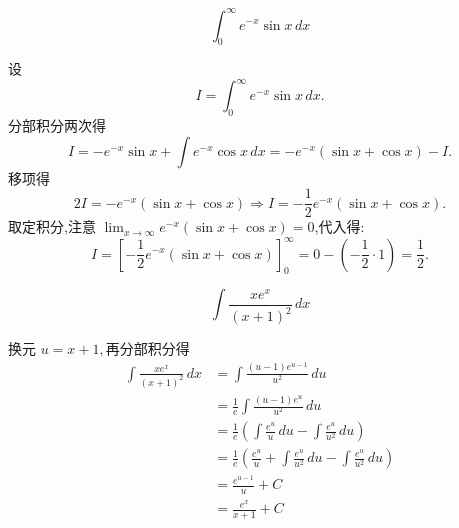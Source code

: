 \begin{questions}
    \question 
    \[
    \int_0^{\infty} e^{-x} \sin x \, dx
    \]
    \begin{solution}
        设
        \[
        I = \int_0^{\infty} e^{-x} \sin x \, dx.
        \]
        分部积分两次得
        \[
        I = -e^{-x} \sin x + \int e^{-x} \cos x \, dx
        = -e^{-x} (\sin x + \cos x) - I.
        \]
        移项得
        \[
        2I = -e^{-x} (\sin x + \cos x)
        \Rightarrow I = -\frac{1}{2} e^{-x} (\sin x + \cos x).
        \]
        取定积分,注意 $\displaystyle \lim_{x \to \infty} e^{-x} (\sin x + \cos x) = 0$,代入得:
        \[
        I = \left[ -\frac{1}{2} e^{-x} (\sin x + \cos x) \right]_0^{\infty}
        = 0 - \left(-\frac{1}{2} \cdot 1\right) = \frac{1}{2}.
        \]
    \end{solution}

    \question 
    \[
    \int \frac{xe^x}{(x+1)^2} \,dx
    \]
    \begin{solution}
        换元 $u=x+1,$再分部积分得 
        \begin{align*}
        \int \frac{xe^x}{(x+1)^2} \,dx 
        &= \int \frac{(u - 1)e^{u - 1}}{u^2} \,du \\
        &= \frac{1}{e} \int \frac{(u - 1)e^u}{u^2} \,du \\
        &= \frac{1}{e} \left( \int \frac{e^u}{u} \,du - \int \frac{e^u}{u^2} \,du \right) \\
        &= \frac{1}{e} \left( \frac{e^u}{u} + \int \frac{e^u}{u^2} \,du - \int \frac{e^u}{u^2} \,du \right) \\
        &= \frac{e^{u - 1}}{u} + C\\
        &= \frac{e^x}{x + 1} + C
        \end{align*}
    \end{solution}


\end{questions}
